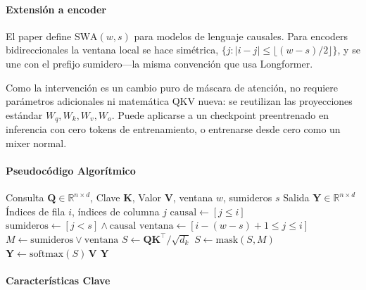 \paragraph{Extensión a encoder} El paper define $\mathrm{SWA}(w,s)$ para modelos de lenguaje causales. Para encoders bidireccionales la ventana local se hace simétrica, $\{j : |i-j| \leq \lfloor (w-s)/2 \rfloor\}$, y se une con el prefijo sumidero---la misma convención que usa Longformer.

Como la intervención es un cambio puro de máscara de atención, no requiere parámetros adicionales ni matemática QKV nueva: se reutilizan las proyecciones estándar $W_q, W_k, W_v, W_o$. Puede aplicarse a un checkpoint preentrenado en inferencia con cero tokens de entrenamiento, o entrenarse desde cero como un mixer normal.

\paragraph{Pseudocódigo Algorítmico}

\begin{algorithm}[H]
\caption{SWA con Sumideros de Atención: Construcción de Máscara y Atención}
\begin{algorithmic}[1]
\Require Consulta $\mathbf{Q} \in \mathbb{R}^{n \times d}$, Clave $\mathbf{K}$, Valor $\mathbf{V}$, ventana $w$, sumideros $s$
\Ensure Salida $\mathbf{Y} \in \mathbb{R}^{n \times d}$
\State Índices de fila $i$, índices de columna $j$
\State $\text{causal} \gets [j \leq i]$
\State $\text{sumideros} \gets [j < s] \wedge \text{causal}$ 
\State $\text{ventana} \gets [i - (w-s) + 1 \leq j \leq i]$
\State $M \gets \text{sumideros} \lor \text{ventana}$
\State $S \gets \mathbf{Q}\mathbf{K}^{\top} / \sqrt{d_k}$
\State $S \gets \text{mask}(S, M)$ 
\State $\mathbf{Y} \gets \text{softmax}(S)\, \mathbf{V}$
\Return $\mathbf{Y}$
\end{algorithmic}
\end{algorithm}

\paragraph{Características Clave}

